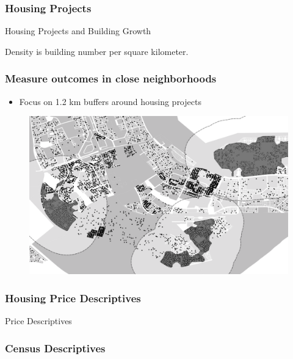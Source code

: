 \documentclass[aspectratio=149]{beamer}
\begin{document}

\begin{frame}
\frametitle{Housing Projects}
\begin{table}
\caption{Housing Projects and Building Growth}

\end{table}
\vspace{.2cm} 
Density is building number per square kilometer.
\end{frame}


\begin{frame}
\frametitle{Measure outcomes in close neighborhoods}
\begin{itemize}
  \item Focus on 1.2 km buffers around housing projects
\end{itemize}
\begin{center}
\begin{figure}
\includegraphics[scale=0.30]{design2.png}
\vspace{-3mm}
\end{figure}
\end{center}
\end{frame}


\begin{frame}
\frametitle{Housing Price Descriptives}
\begin{table}
\caption{Price Descriptives}
\centering
\resizebox{.95\textwidth}{!}{  

}
\end{table}
\end{frame}


\begin{frame}
\frametitle{Census Descriptives}

\centering
\resizebox{\textwidth}{!}{  

}

\end{frame}
\end{document}
